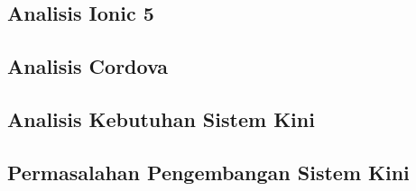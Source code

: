 \subsection{Analisis Ionic 5}
\label{sec:analisisIonic5}

\subsection{Analisis Cordova}
\label{sec:analisisIonicCordova}

\subsection{Analisis Kebutuhan Sistem Kini}
\label{sec:analisisKebutuhanSistem}

\subsection{Permasalahan Pengembangan Sistem Kini}
\label{sec:analisisPermasalahanSistemKini}

